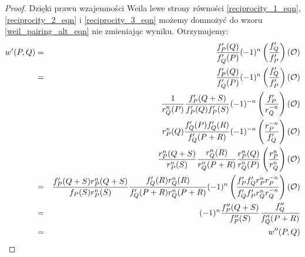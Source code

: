 \begin{proof}
Dzięki prawu wzajemności Weila lewe strony równości
\ref{reciprocity_1_eqn}, \ref{reciprocity_2_eqn} i \ref{reciprocity_3_eqn}
możemy domnożyć do wzoru \ref{weil_pairing_alt_eqn}
nie zmieniając wyniku.
Otrzymujemy:
\begin{eqnarray*}
w'(P,Q)
& = & \frac{f_P'(Q)}{f_Q'(P)}(-1)^n\left(\frac{f_Q'}{f_P'}\right)(\mathcal{O}) \\
& = & \frac{f_P'(Q)}{f_Q'(P)}(-1)^n\left(\frac{f_Q'}{f_P'}\right)(\mathcal{O}) \\
&   & \frac{1}{r_Q^n(P)}\frac{f_P'(Q+S)}{f_P'(Q)f_P'(S)}
      (-1)^{-n}\left(\frac{f_P'}{r_Q^{-n}}\right)(\mathcal{O}) \\
&   & r_P^n(Q)\frac{f_Q'(P)f_Q'(R)}{f_Q'(P+R)}
      (-1)^{-n}\left(\frac{r_P^{-n}}{f_Q'}\right)(\mathcal{O}) \\
&   & \frac{r_P^n(Q+S)}{r_P^n(S)}
      \frac{r_Q^n(R)}{r_Q^n(P+R)}
      \frac{r_P^n(Q)}{r_Q^n(P)}
      \left(\frac{r_P^n}{r_Q^n}\right)(\mathcal{O}) \\
& = & \frac{f_P'(Q+S)r_P^n(Q+S)}{f_P(S)r_P^n(S)}
      \frac{f_Q'(R)r_Q^n(R)}{f_Q'(P+R)r_Q^n(P+R)}
      (-1)^n\left(
      \frac{f_P'f_Q'r_P^nr_P^{-n}}{f_Q'f_P'r_Q^nr_Q^{-n}}
      \right)(\mathcal{O}) \\
& = & (-1)^n\frac{f_P''(Q+S)}{f_P''(S)}
      \frac{f_Q''}{f_Q''(P+R)} \\
& = & w''(P,Q)
\end{eqnarray*}
\end{proof}
